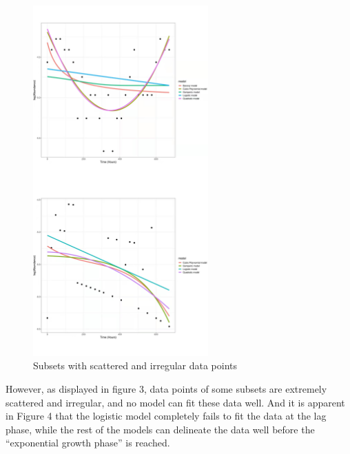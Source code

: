 \documentclass[11pt, a4paper]{article}
\begin{document}
\begin{figure}[H]
    \centering
    \includegraphics[width=0.6\textwidth]{figure3}
    \caption{Subsets with scattered and irregular data points}
    \label{figure3}
\end{figure}

However, as displayed in figure 3, data points of some subsets are extremely scattered and irregular, and no model can fit these data well. And it is apparent in Figure 4 that the logistic model completely fails to fit the data at the lag phase, while the rest of the models can delineate the data well before the “exponential growth phase” is reached. 
\end{document}
